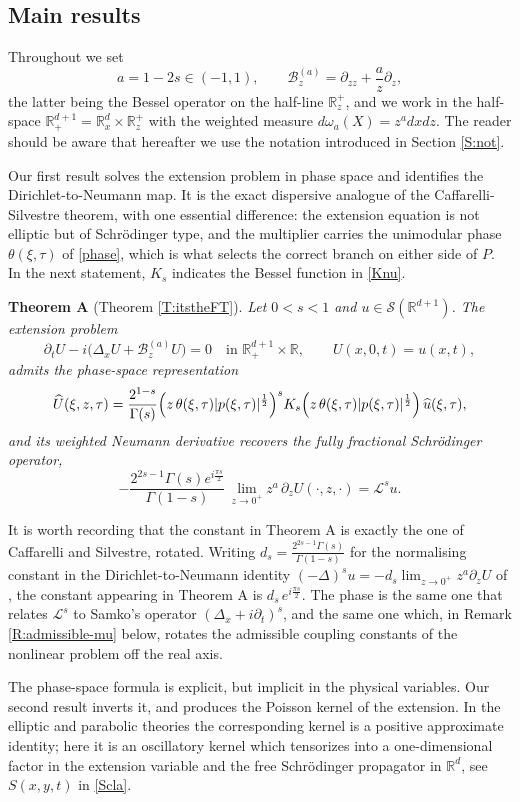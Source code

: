 \documentclass[11pt,letter]{amsart}
\def \RNu {\mathbb{R}^{d+1}}
\def \RN {\mathbb{R}_+^{d+1}}
\def \R {\mathbb{R}}
\def \G{\Gamma}
\newcommand{\Ba}{\mathscr B_z^{(a)}}
\newcommand{\Rd}{\mathbb R^d}
\newcommand{\p}{\partial}
\numberwithin{equation}{section}
\newcommand{\Le}{\mathcal L}
\numberwithin{equation}{section}
\begin{document}

\subsection{Main results}\label{S:mainres}

Throughout we set
\[
a=1-2s\in(-1,1),
\qquad
\Ba=\p_{zz}+\frac az\p_z ,
\]
the latter being the Bessel operator on the half-line $\R^+_z$, and we work in
the half-space $\RN=\Rd_x\times\R^+_z$ with the weighted measure
$d\omega_a(X)=z^adxdz$. The reader should be aware that hereafter we use the notation introduced in Section \ref{S:not}. 


Our first result solves the extension problem in phase space and identifies the
Dirichlet-to-Neumann map. It is the exact dispersive analogue of the
Caffarelli-Silvestre theorem, with one essential difference: the extension
equation is not elliptic but of Schr\"odinger type, and the multiplier carries
the unimodular phase $\theta(\xi,\tau)$ of \eqref{phase}, which is what selects
the correct branch on either side of $P$. In the next statement, $K_s$ indicates the Bessel function in \eqref{Knu}.

\medskip
\noindent\textbf{Theorem A} (Theorem \ref{T:itstheFT}).
\emph{Let $0<s<1$ and $u\in\mathscr S(\RNu)$. The extension problem
\[
\p_tU-i\bigl(\Delta_xU+\Ba U\bigr)=0
\quad\text{in }\RN\times\R,
\qquad
U(x,0,t)=u(x,t),
\]
admits the phase-space representation
\[
\widehat U(\xi,z,\tau)
=\frac{2^{1-s}}{\G(s)}
\Bigl(z\,\theta(\xi,\tau)|p(\xi,\tau)|^{\frac12}\Bigr)^{s}
K_{s}\Bigl(z\,\theta(\xi,\tau)|p(\xi,\tau)|^{\frac12}\Bigr)\,\widehat u(\xi,\tau),
\]
and its weighted Neumann derivative recovers the fully fractional Schr\"odinger
operator,
\[
-\frac{2^{2s-1}\G(s)e^{i\frac{\pi s}{2}}}{\G(1-s)}\,
\lim_{z\to0^+}z^{a}\,\p_zU(\cdot,z,\cdot)=\Le^su .
\]}

\medskip
It is worth recording that the constant in Theorem A is exactly the one of
Caffarelli and Silvestre, rotated. Writing
$d_s=\frac{2^{2s-1}\G(s)}{\G(1-s)}$ for the normalising constant in the
Dirichlet-to-Neumann identity $(-\Delta)^su=-d_s\lim_{z\to0^+}z^a\p_zU$ of
\cite{CS}, the constant appearing in Theorem A is $d_s\,e^{i\frac{\pi s}{2}}$.
The phase is the same one that relates $\Le^s$ to Samko's operator
$(\Delta_x+i\p_t)^s$, and the same one which, in Remark \ref{R:admissible-mu}
below, rotates the admissible coupling constants of the nonlinear problem off
the real axis.

\medskip
The phase-space formula is explicit, but implicit in the physical variables. Our
second result inverts it, and produces the Poisson kernel of the extension. In
the elliptic and parabolic theories the corresponding kernel is a positive
approximate identity; here it is an oscillatory kernel which tensorizes into a
one-dimensional factor in the extension variable and the free Schr\"odinger
propagator in $\Rd$, see $S(x,y,t)$ in \eqref{Scla}. 
\end{document}
